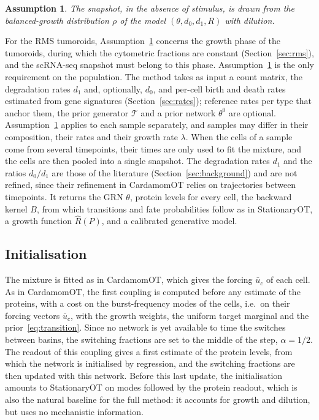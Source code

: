 \documentclass[a4paper, 11pt]{article}
\newcommand{\Tg}{\mathcal{T}}
\theoremstyle{plain}
\newtheorem{conj}{Assumption}
\theoremstyle{remark}
\begin{document}
\begin{conj}\label{ass:balanced}
The snapshot, in the absence of stimulus, is drawn from the balanced-growth distribution $\rho$ of the model $(\theta, d_0, d_1, R)$ with dilution.
\end{conj}

For the RMS tumoroids, Assumption~\ref{ass:balanced} concerns the growth phase of the tumoroids, during which the cytometric fractions are constant (Section~\ref{sec:rms}), and the scRNA-seq snapshot must belong to this phase. Assumption~\ref{ass:balanced} is the only requirement on the population. The method takes as input a count matrix, the degradation rates $d_1$ and, optionally, $d_0$, and per-cell birth and death rates estimated from gene signatures (Section~\ref{sec:rates}); reference rates per type that anchor them, the prior generator $\Tg$ and a prior network $\theta^0$ are optional. Assumption~\ref{ass:balanced} applies to each sample separately, and samples may differ in their composition, their rates and their growth rate $\lambda$. When the cells of a sample come from several timepoints, their times are only used to fit the mixture, and the cells are then pooled into a single snapshot. The degradation rates $d_1$ and the ratios $d_0/d_1$ are those of the literature (Section~\ref{sec:background}) and are not refined, since their refinement in CardamomOT relies on trajectories between timepoints. It returns the GRN $\theta$, protein levels for every cell, the backward kernel $B$, from which transitions and fate probabilities follow as in StationaryOT, a growth function $\hat R(P)$, and a calibrated generative model.

\subsection{Initialisation}

The mixture is fitted as in CardamomOT, which gives the forcing $\bar u_c$ of each cell. As in CardamomOT, the first coupling is computed before any estimate of the proteins, with a cost on the burst-frequency modes of the cells, i.e.\ on their forcing vectors $\bar u_c$, with the growth weights, the uniform target marginal and the prior~\eqref{eq:transition}. Since no network is yet available to time the switches between basins, the switching fractions are set to the middle of the step, $\alpha = 1/2$. The readout of this coupling gives a first estimate of the protein levels, from which the network is initialised by regression, and the switching fractions are then updated with this network. Before this last update, the initialisation amounts to StationaryOT on modes followed by the protein readout, which is also the natural baseline for the full method: it accounts for growth and dilution, but uses no mechanistic information.
\end{document}
